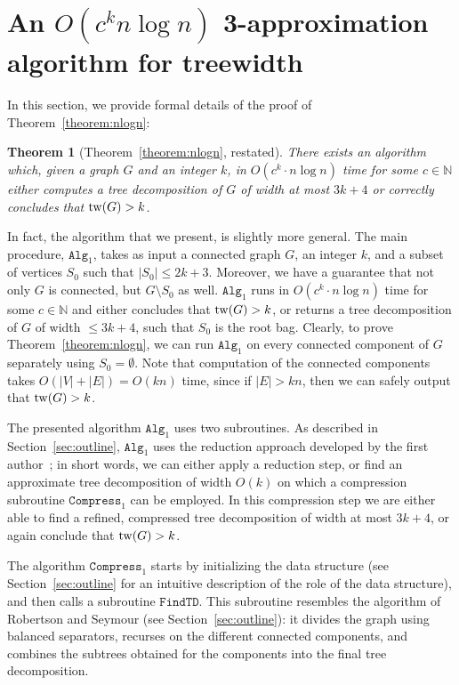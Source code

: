 \documentclass[a4paper,11pt]{article}
\newtheorem{theorem}{Theorem}
\theoremstyle{definition}
\theoremstyle{remark}
\newcommand{\findTD}{\mathtt{FindTD}}
\newcommand{\compress}[1]{\mathtt{Compress}_{#1}}
\newcommand{\alg}[1]{\mathtt{Alg}_{#1}}
\begin{document}
\section{An $O(c^k n \log n)$ 3-approximation algorithm for treewidth}
\label{section:nlogn}

In this section, we provide formal details of the proof of
Theorem~\ref{theorem:nlogn}:
\begin{theorem}[Theorem~\ref{theorem:nlogn}, restated]
  There exists an algorithm which, given a graph $G$ and an integer
  $k$, in $O(c^k\cdot n \log n)$ time for some $c \in \mathbb{N}$
  either computes a tree decomposition of $G$ of width at most $3k +
  4$ or correctly concludes that $\mathrm{tw}(G) > k$.
\end{theorem}

In fact, the algorithm that we present, is slightly more general.  The
main procedure, $\alg{1}$, takes as input a connected graph $G$, an
integer $k$, and a subset of vertices $S_0$ such that $|S_0|\leq
2k+3$.  Moreover, we have a guarantee that not only $G$ is connected,
but $G\setminus S_0$ as well.  $\alg{1}$ runs in $O(c^k\cdot n \log
n)$ time for some $c \in \mathbb{N}$ and either concludes that $\mathrm{tw}(G)
> k$, or returns a tree decomposition of $G$ of width $\leq 3k + 4$,
such that $S_0$ is the root bag.  Clearly, to prove
Theorem~\ref{theorem:nlogn}, we can run $\alg{1}$ on every connected
component of $G$ separately using $S_0=\emptyset$.  Note that
computation of the connected components takes $O(|V|+|E|)=O(kn)$ time,
since if $|E|>kn$, then we can safely output that $\mathrm{tw}(G)>k$.

The presented algorithm $\alg{1}$ uses two subroutines.  As described
in Section~\ref{sec:outline}, $\alg{1}$ uses the reduction approach
developed by the first author~\cite{Bodlaender96}; in short words, we
can either apply a reduction step, or find an approximate tree
decomposition of width $O(k)$ on which a compression subroutine
$\compress{1}$ can be employed.  In this compression step we are
either able to find a refined, compressed tree decomposition of width
at most $3k + 4$, or again conclude that $\mathrm{tw}(G)>k$.

The algorithm $\compress{1}$ starts by initializing the data structure
(see Section~\ref{sec:outline} for an intuitive description of the
role of the data structure), and then calls a subroutine $\findTD$.
This subroutine resembles the algorithm of Robertson and Seymour (see
Section~\ref{sec:outline}): it divides the graph using balanced
separators, recurses on the different connected components, and
combines the subtrees obtained for the components into the final tree
decomposition.
\end{document}
